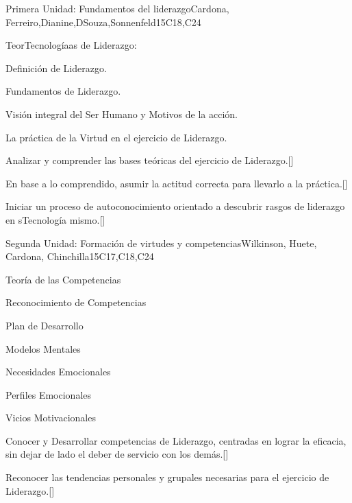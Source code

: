 \begin{syllabus}
\begin{unit}{}{Primera Unidad: Fundamentos del liderazgo}{Cardona, Ferreiro,Dianine,DSouza,Sonnenfeld}{15}{C18,C24}
\begin{topics}
	\item TeorTecnologíaas de Liderazgo: 
	\item Definición de Liderazgo.
	\item Fundamentos de Liderazgo.
	\item Visión integral del Ser Humano y Motivos de la acción.
	\item La práctica de la Virtud en el ejercicio de Liderazgo.
\end{topics}
\begin{learningoutcomes}
	\item Analizar y comprender las bases teóricas del ejercicio de Liderazgo.[\Familiarity]
	\item En base a lo comprendido, asumir la actitud correcta para llevarlo a la práctica.[\Familiarity]
	\item Iniciar un proceso de autoconocimiento orientado a descubrir rasgos de liderazgo en sTecnología mismo.[\Familiarity]
\end{learningoutcomes}
\end{unit}

\begin{unit}{}{Segunda Unidad: Formación de virtudes y competencias}{Wilkinson, Huete, Cardona, Chinchilla}{15}{C17,C18,C24}
\begin{topics}
	
	\item Teoría de las Competencias 
	\item Reconocimiento de Competencias
	\item Plan de Desarrollo
	\item Modelos Mentales
	\item Necesidades Emocionales
	\item Perfiles Emocionales
	\item Vicios Motivacionales

\end{topics}
\begin{learningoutcomes}
	\item Conocer y Desarrollar competencias de Liderazgo, centradas en lograr la eficacia, sin dejar de lado el deber de servicio con los demás.[\Familiarity]
	\item Reconocer las tendencias personales y grupales necesarias para el ejercicio de Liderazgo.[\Familiarity]
\end{learningoutcomes}
\end{unit}


\end{syllabus}
